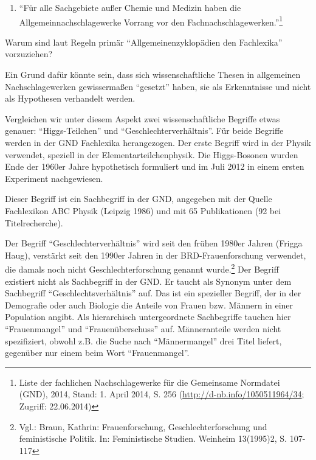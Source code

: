 \documentclass[a4paper,
fontsize=11pt,
oneside,
numbers=noperiodatend,
parskip=half-,
bibliography=totoc,
final
]{scrartcl}
\begin{document}
\begin{enumerate}
\def\labelenumi{\arabic{enumi}.}
\itemsep1pt\parskip0pt
\item
  \enquote{Für alle Sachgebiete außer Chemie und Medizin haben die
  Allgemeinnachschlagewerke Vorrang vor den
  Fachnachschlagewerken.}\footnote{Liste der fachlichen Nachschlagewerke
    für die Gemeinsame Normdatei (GND), 2014, Stand: 1. April 2014, S.
    256 (\url{http://d-nb.info/1050511964/34}; Zugriff: 22.06.2014)}
\end{enumerate}

Warum sind laut Regeln primär \enquote{Allgemeinenzyklopädien den
Fachlexika} vorzuziehen?

Ein Grund dafür könnte sein, dass sich wissenschaftliche Thesen in
allgemeinen Nachschlagewerken gewissermaßen \enquote{gesetzt} haben, sie
als Erkenntnisse und nicht als Hypothesen verhandelt werden.

Vergleichen wir unter diesem Aspekt zwei wissenschaftliche Begriffe
etwas genauer: \enquote{Higgs-Teilchen} und
\enquote{Geschlechterverhältnis}. Für beide Begriffe werden in der GND
Fachlexika herangezogen. Der erste Begriff wird in der Physik verwendet,
speziell in der Elementarteilchenphysik. Die Higgs-Bosonen wurden Ende
der 1960er Jahre hypothetisch formuliert und im Juli 2012 in einem
ersten Experiment nachgewiesen.

Dieser Begriff ist ein Sachbegriff in der GND, angegeben mit der Quelle
Fachlexikon ABC Physik (Leipzig 1986) und mit 65 Publikationen (92 bei
Titelrecherche).

Der Begriff \enquote{Geschlechterverhältnis} wird seit den frühen 1980er
Jahren (Frigga Haug), verstärkt seit den 1990er Jahren in der
BRD-Frauenforschung verwendet, die damals noch nicht
Geschlechterforschung genannt wurde.\footnote{Vgl.: Braun, Kathrin:
  Frauenforschung, Geschlechterforschung und feministische Politik. In:
  Feministische Studien. Weinheim 13(1995)2, S. 107-117} Der Begriff
existiert nicht als Sachbegriff in der GND. Er taucht als Synonym unter
dem Sachbegriff \enquote{Geschlechtsverhältnis} auf. Das ist ein
spezieller Begriff, der in der Demografie oder auch Biologie die Anteile
von Frauen bzw. Männern in einer Population angibt. Als hierarchisch
untergeordnete Sachbegriffe tauchen hier \enquote{Frauenmangel} und
\enquote{Frauenüberschuss} auf. Männeranteile werden nicht spezifiziert,
obwohl z.B. die Suche nach \enquote{Männermangel} drei Titel liefert,
gegenüber nur einem beim Wort \enquote{Frauenmangel}.
\end{document}
